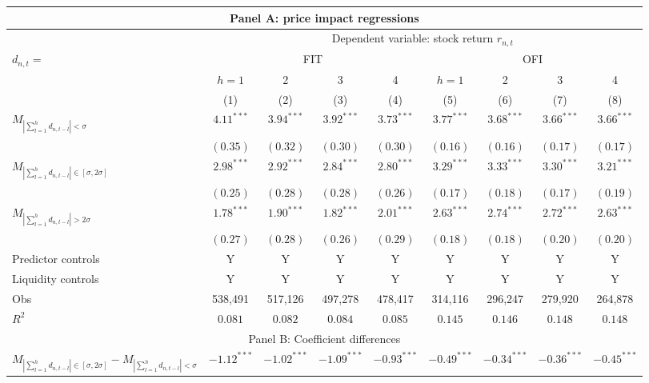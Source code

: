 \begin{tabular}{lcccccccc}
  \hline \multicolumn{9}{c}{Panel A: price impact regressions} \\
 \hline 
    & \multicolumn{8}{c}{Dependent variable: stock return $r_{n,t}$} \\

    \cmidrule(l){2-9} $d_{n,t} = $ & \multicolumn{4}{c}{FIT} & \multicolumn{4}{c}{OFI} \\
 \cmidrule(l){2-5} \cmidrule(l){6-9} 
  & $h=1$ & 2 & 3 & 4 & $h=1$ & 2 & 3 & 4 \\ 
   \cmidrule(l){2-5} \cmidrule(l){6-9} \vspace{5pt} & (1) & (2) & (3) & (4) & (5) & (6) & (7) & (8) \\ 
  $M_{\left|\sum_{l=1}^h d_{n,t-l}\right| < \sigma}$ & $4.11^{***}$ & $3.94^{***}$ & $3.92^{***}$ & $3.73^{***}$ & $3.77^{***}$ & $3.68^{***}$ & $3.66^{***}$ & $3.66^{***}$ \\ 
   & $(0.35)$ & $(0.32)$ & $(0.30)$ & $(0.30)$ & $(0.16)$ & $(0.16)$ & $(0.17)$ & $(0.17)$ \\ 
  $M_{\left|\sum_{l=1}^h d_{n,t-l}\right| \in [\sigma, 2\sigma]}$ & $2.98^{***}$ & $2.92^{***}$ & $2.84^{***}$ & $2.80^{***}$ & $3.29^{***}$ & $3.33^{***}$ & $3.30^{***}$ & $3.21^{***}$ \\ 
   & $(0.25)$ & $(0.28)$ & $(0.28)$ & $(0.26)$ & $(0.17)$ & $(0.18)$ & $(0.17)$ & $(0.19)$ \\ 
  $M_{\left|\sum_{l=1}^h d_{n,t-l}\right| > 2 \sigma}$ & $1.78^{***}$ & $1.90^{***}$ & $1.82^{***}$ & $2.01^{***}$ & $2.63^{***}$ & $2.74^{***}$ & $2.72^{***}$ & $2.63^{***}$ \\ 
   \vspace{5pt} & $(0.27)$ & $(0.28)$ & $(0.26)$ & $(0.29)$ & $(0.18)$ & $(0.18)$ & $(0.20)$ & $(0.20)$ \\ 
  Predictor controls & Y & Y & Y & Y & Y & Y & Y & Y \\ 
   \vspace{5pt}Liquidity controls & Y & Y & Y & Y & Y & Y & Y & Y \\ 
  Obs & 538,491 & 517,126 & 497,278 & 478,417 & 314,116 & 296,247 & 279,920 & 264,878 \\ 
  $R^2$ & $0.081$ & $0.082$ & $0.084$ & $0.085$ & $0.145$ & $0.146$ & $0.148$ & $0.148$ \\ 
   \hline \multicolumn{9}{c}{Panel B: Coefficient differences} \\
 \hline$M_{\left|\sum_{l=1}^h d_{n,t-l}\right| \in [\sigma, 2\sigma]}-M_{\left|\sum_{l=1}^h d_{n,t-l}\right| < \sigma}$ & $-1.12^{***}$ & $-1.02^{***}$ & $-1.09^{***}$ & $-0.93^{***}$ & $-0.49^{***}$ & $-0.34^{***}$ & $-0.36^{***}$ & $-0.45^{***}$ \\ 

\end{tabular}
